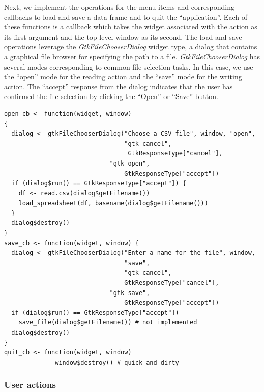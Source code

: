 \documentclass[article]{jss}
\begin{document}
Next, we implement the operations for the menu items and corresponding
callbacks to load and save a data frame and to quit the
``application''. Each of these functions is a callback which takes the
widget associated with the action as its first argument and the
top-level window as its second. The load and save operations leverage
the \emph{GtkFileChooserDialog} widget type, a dialog that contains a
graphical file browser for specifying the path to a
file. \emph{GtkFileChooserDialog} has several modes corresponding to
common file selection tasks. In this case, we use the ``open'' mode
for the reading action and the ``save'' mode for the writing action. The
``accept'' response from the dialog indicates that the user has
confirmed the file selection by clicking the ``Open'' or ``Save''
button.
\begin{verbatim}
open_cb <- function(widget, window)  
{
  dialog <- gtkFileChooserDialog("Choose a CSV file", window, "open",
                                 "gtk-cancel",
                                  GtkResponseType["cancel"],
	      	                 "gtk-open",
                                 GtkResponseType["accept"])
  if (dialog$run() == GtkResponseType["accept"]) {
    df <- read.csv(dialog$getFilename())
    load_spreadsheet(df, basename(dialog$getFilename()))
  }
  dialog$destroy()
}
save_cb <- function(widget, window) {
  dialog <- gtkFileChooserDialog("Enter a name for the file", window,
                                 "save",
                                 "gtk-cancel",
                                 GtkResponseType["cancel"],
          	                 "gtk-save",
                                 GtkResponseType["accept"])
  if (dialog$run() == GtkResponseType["accept"])
    save_file(dialog$getFilename()) # not implemented
  dialog$destroy()
}
quit_cb <- function(widget, window) 
              window$destroy() # quick and dirty

\end{verbatim}

\subsubsection{User actions}\label{sec:spreadsheet-actions}
\end{document}
